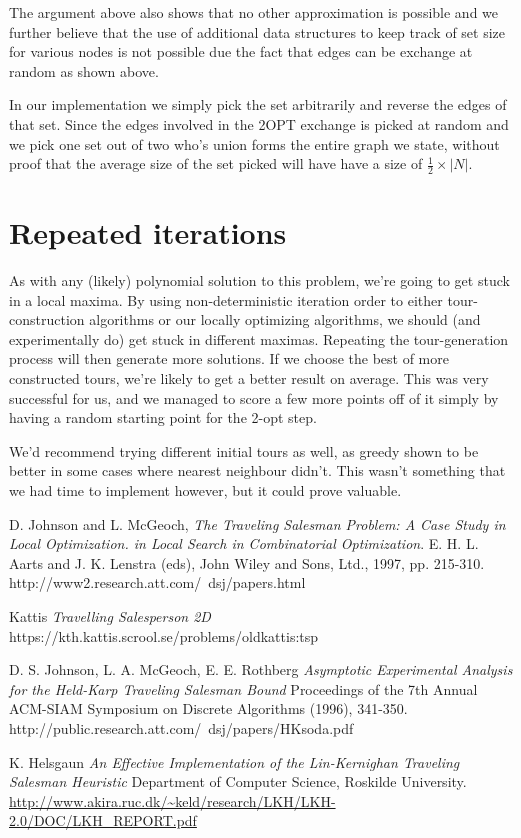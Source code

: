 \documentclass[a4paper,12pt,oneside]{article}
\begin{document}
The argument above also shows that no other approximation is possible and we further believe that the use of additional data structures to keep track of set size for various nodes is not possible due the fact that edges can be exchange at random as shown above.

In our implementation we simply pick the set arbitrarily and reverse the edges of that set. Since the edges involved in the 2OPT exchange is picked at random and we pick one set out of two who's union forms the entire graph we state, without proof that the average size of the set picked will have have a size of $\frac{1}{2} \times |N|$.


\section{Repeated iterations}

As with any (likely) polynomial solution to this problem, we're going to get stuck in a local maxima. By using non-deterministic iteration order to either tour-construction algorithms or our locally optimizing algorithms, we should (and experimentally do) get stuck in different maximas. Repeating the tour-generation process will then generate more solutions. If we choose the best of more constructed tours, we're likely to get a better result on average. This was very successful for us, and we managed to score a few more points off of it simply by having a random starting point for the 2-opt step.

We'd recommend trying different initial tours as well, as greedy shown to be better in some cases where nearest neighbour didn't. This wasn't something that we had time to implement however, but it could prove valuable.

\begin{thebibliography}{9}

	D. Johnson and L. McGeoch,
	\emph{The Traveling Salesman Problem: A Case Study in Local Optimization. in Local Search in Combinatorial Optimization}.
	E. H. L. Aarts and J. K. Lenstra (eds), John Wiley and Sons, Ltd., 1997, pp. 215-310. http://www2.research.att.com/~dsj/papers.html

	Kattis
	\emph{Travelling Salesperson 2D}
	https://kth.kattis.scrool.se/problems/oldkattis:tsp

	D. S. Johnson, L. A. McGeoch, E. E. Rothberg
	\emph{Asymptotic Experimental Analysis for the Held-Karp Traveling Salesman Bound}
	Proceedings of the 7th Annual ACM-SIAM Symposium on Discrete Algorithms (1996), 341-350. http://public.research.att.com/~dsj/papers/HKsoda.pdf

	K. Helsgaun
	\emph{An Effective Implementation of the Lin-Kernighan Traveling Salesman Heuristic}
	Department of Computer Science, Roskilde University. \url{http://www.akira.ruc.dk/~keld/research/LKH/LKH-2.0/DOC/LKH_REPORT.pdf}
\end{thebibliography}
\end{document}

